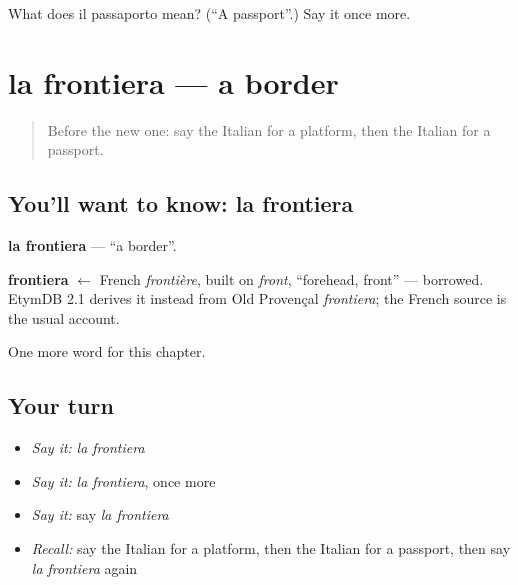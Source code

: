 \begin{tcolorbox}[breakable,colback=teal!4,colframe=teal!35!black,title={Before you move on}]
What does il passaporto mean? (\textquotedblleft{}A passport\textquotedblright{}.) Say it once more.
\end{tcolorbox}
\section[la frontiera]{la frontiera — a border}

\label{lesson:IT-C192-frontiera}



\begin{quote}
Before the new one: say the Italian for a platform, then the Italian for a passport.
\end{quote}

\subsection*{You'll want to know: la frontiera}
\textbf{la frontiera} — \textquotedblleft{}a border\textquotedblright{}.

\begin{cousinweb}
\textbf{frontiera} $\leftarrow$ French \emph{frontière}, built on \emph{front}, \textquotedblleft{}forehead, front\textquotedblright{} — borrowed. EtymDB 2.1 derives it instead from Old Provençal \emph{frontiera}; the French source is the usual account.
\end{cousinweb}

\begin{grammarlens}[title={What you've built}]
One more word for this chapter.
\end{grammarlens}

\subsection*{Your turn}
\begin{itemize}
\raggedright
  \item \emph{Say it:} \emph{la frontiera}
  \item \emph{Say it:} \emph{la frontiera}, once more
  \item \emph{Say it:} say \emph{la frontiera}
  \item \emph{Recall:} say the Italian for a platform, then the Italian for a passport, then say \emph{la frontiera} again
\end{itemize}

